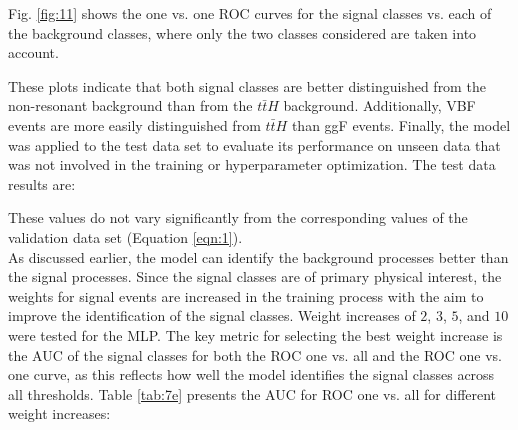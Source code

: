 Fig. \ref{fig:11} shows the one vs. one ROC curves for the signal classes vs. each of the background classes, where only the two classes considered are taken into account. 


These plots indicate that both signal classes are better distinguished from the non-resonant background than from the $t \bar{t}H$ background. Additionally, VBF events are more easily distinguished
from $t \bar{t}H$ than ggF events. Finally, the model was applied to the test data set to evaluate its performance on unseen data that was not involved in the training or hyperparameter optimization.
The test data results are:


These values do not vary significantly from the corresponding values of the validation data set (Equation \ref{eqn:1}). \\

As discussed earlier, the model can identify the background processes better than the signal processes. Since the signal classes are of primary physical interest, the weights for signal
events are increased in the training process with the aim to improve the identification of the signal classes. Weight increases of $2$, $3$, $5$, and $10$ were tested for the MLP. The key metric for selecting the best
weight increase is the AUC of the signal classes for both the ROC one vs. all and the ROC one vs. one curve,
as this reflects how well the model identifies the signal classes across all thresholds. Table \ref{tab:7e} presents the AUC for ROC one vs. all for different weight increases:




